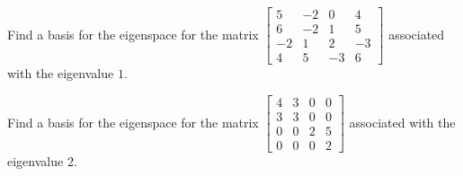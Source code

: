 \begin{activity}{10}
Find a basis for the eigenspace for the matrix
\(
  \begin{bmatrix}
    5 & -2 & 0 & 4 \\ 6 & -2 & 1 & 5 \\ -2 & 1 & 2 & -3 \\ 4 & 5 & -3 & 6
  \end{bmatrix}
\)
associated with the eigenvalue \(1\).
\end{activity}



\begin{activity}{10}
Find a basis for the eigenspace for the matrix
\(
  \begin{bmatrix}
    4 & 3 & 0 & 0 \\ 3 & 3 & 0 & 0 \\ 0 & 0 & 2 & 5 \\ 0 & 0 & 0 & 2
  \end{bmatrix}
\)
associated with the eigenvalue \(2\).
\end{activity}
